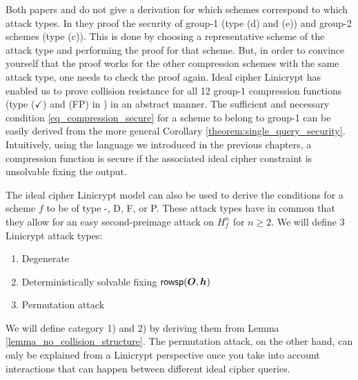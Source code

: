 Both papers \cite{C:PreGovVan93} and \cite{C:BlaRogShr02} do not give a derivation for which schemes correspond to which attack types.
In \cite{C:BlaRogShr02} they proof the security of group-1 (type (d) and (e)) and group-2 schemes (type (c)).
This is done by choosing a representative scheme of the attack type and performing the proof for that scheme.
But, in order to convince yourself that the proof works for the other compression schemes with the same attack type,
one needs to check the proof again.
Ideal cipher Linicrypt has enabled us to prove collision resistance for all 12 group-1 compression functions (type ($\checkmark$) and (FP) in \cite{C:PreGovVan93}) in an abstract manner.
The sufficient and necessary condition \eqref{eq_compression_secure} for a scheme to belong to group-1
can be easily derived from the more general Corollary \ref{theorem:single_query_security}.
Intuitively, using the language we introduced in the previous chapters,
a compression function is secure if the associated ideal cipher constraint is unsolvable fixing the output.

The ideal cipher Linicrypt model can also be used to derive the conditions for a scheme $f$ to be of type -, D, F, or P. 
These attack types have in common that they allow for an easy second-preimage attack on $H^n_f$ for $n \geq 2$.
We will define 3 Linicrypt attack types:
\begin{enumerate}
\item Degenerate
\item Deterministically solvable fixing $\mathsf{rowsp}(\boldsymbol{O}, \boldsymbol h)$
\item Permutation attack
\end{enumerate}
We will define category 1) and 2) by deriving them from Lemma \ref{lemma_no_collision_structure}.
The permutation attack, on the other hand, can only be explained from a Linicrypt perspective
once you take into account interactions that can happen between different ideal cipher queries.

